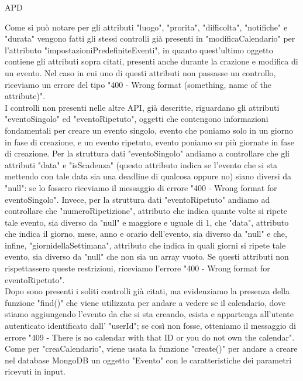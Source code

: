 \begin{listaPersonale} {APD}
\begin{listaPersonale2}[APD]{}
                Come si può notare per gli attributi "luogo", "prorita", "difficolta", "notifiche" e "durata" vengono fatti gli stessi controlli già presenti in "modificaCalendario" per l'attributo "impostazioniPredefiniteEventi", in quanto quest'ultimo oggetto contiene gli attributi sopra citati, presenti anche durante la crazione e modifica di un evento. Nel caso in cui uno di questi attributi non passasse un controllo, riceviamo un errore del tipo "400 - Wrong format (something, name of the attribute)". \\
                I controlli non presenti nelle altre API, già descritte, riguardano gli attributi "eventoSingolo" ed "eventoRipetuto", oggetti che contengono informazioni fondamentali per creare un evento singolo, evento che poniamo solo in un giorno in fase di creazione, e un evento ripetuto, evento poniamo su più giornate in fase di creazione. Per la struttura dati "eventoSingolo" andiamo a controllare che gli attributi "data" e "isScadenza" (questo attributo indica se l'evento che si sta mettendo con tale data sia una deadline di qualcosa oppure no) siano diversi da "null": se lo fossero riceviamo il messaggio di errore "400 - Wrong format for eventoSingolo".  Invece, per la struttura dati "eventoRipetuto" andiamo ad controllare che "numeroRipetizione", attributo che indica quante volte si ripete tale evento, sia diverso da "null" e maggiore e uguale di 1, che "data", attributo che indica il giorno, mese, anno e orario dell'evento, sia diverso da "null" e che, infine, "giornidellaSettimana", attributo che indica in quali giorni si ripete tale evento, sia diverso da "null" che non sia un array vuoto. Se questi attributi non rispettassero queste restrizioni, riceviamo l'errore "400 - Wrong format for eventoRipetuto". \\
                Dopo sono presenti i soliti controlli già citati, ma evidenziamo la presenza della funzione "find()" che viene utilizzata per andare a vedere se il calendario, dove stiamo aggiungendo l'evento da che si sta creando, esista e appartenga all'utente autenticato identificato dall' "userId"; se così non fosse, otteniamo il messaggio di errore  "409 - There is no calendar with that ID or you do not own the calendar". Come per "creaCalendario", viene usata la funzione "create()" per andare a creare nel database MongoDB un oggetto "Evento" con le caratteristiche dei parametri ricevuti in input.
                \begin{center}

\end{center}
\end{listaPersonale2}
\end{listaPersonale}
